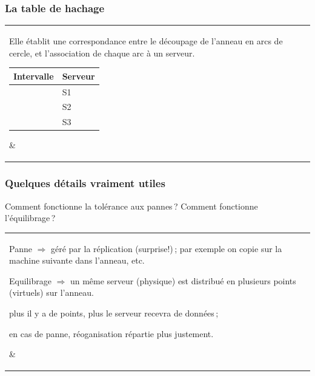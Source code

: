 \begin{frame}
\frametitle{La table de hachage}

\begin{tabular}{l|p{6cm}}
   \parbox{5cm}{
   
    Elle établit une correspondance
entre le découpage de l'anneau en arcs de cercle, et l'association de chaque
arc à un serveur.

\medskip

\begin{tabular}{r|l}
Intervalle  & Serveur\\
\hline
$]c, a]$ & S1 \\
$]a, b]$ & S2  \\
$]b, c]$ & S3  \\
\hline
\end{tabular}

   }  %
  & 
  \parbox{6.5cm}{
   \parbox{5cm}{ }
}

\end{tabular}

\end{frame}


\begin{frame}
\frametitle{Quelques détails vraiment utiles}

Comment fonctionne la tolérance aux pannes\,? Comment fonctionne l'équilibrage\,?


\vfill

\begin{tabular}{l|p{6cm}}
   \parbox{6cm}{


\alert{Panne} $\Rightarrow$ géré par la réplication (surprise!)\,; 
par exemple on copie sur la machine suivante dans l'anneau, etc.


  \vfill
  
\alert{Equilibrage} $\Rightarrow$ un même serveur (physique) est distribué
en plusieurs points (virtuels) sur l'anneau.

\begin{redbullet}
  \item plus il y a de points, plus le serveur recevra de données\,;
  \item en cas de panne, réoganisation répartie plus justement.
\end{redbullet}
  
   }  %
  & 
  \parbox{6.5cm}{ }
\end{tabular}

\end{frame}


